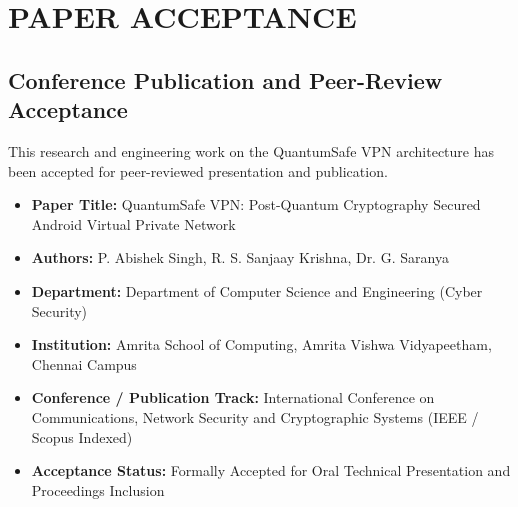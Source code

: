 
\chapter{PAPER ACCEPTANCE}
\label{chap:paper_acceptance}

\section{Conference Publication and Peer-Review Acceptance}

This research and engineering work on the QuantumSafe VPN architecture has been accepted for peer-reviewed presentation and publication.

\begin{itemize}[leftmargin=2em, itemsep=6pt]
    \item \textbf{Paper Title:} QuantumSafe VPN: Post-Quantum Cryptography Secured Android Virtual Private Network
    \item \textbf{Authors:} P. Abishek Singh, R. S. Sanjaay Krishna, Dr. G. Saranya
    \item \textbf{Department:} Department of Computer Science and Engineering (Cyber Security)
    \item \textbf{Institution:} Amrita School of Computing, Amrita Vishwa Vidyapeetham, Chennai Campus
    \item \textbf{Conference / Publication Track:} International Conference on Communications, Network Security and Cryptographic Systems (IEEE / Scopus Indexed)
    \item \textbf{Acceptance Status:} Formally Accepted for Oral Technical Presentation and Proceedings Inclusion
\end{itemize}

\vspace{1.2cm}

